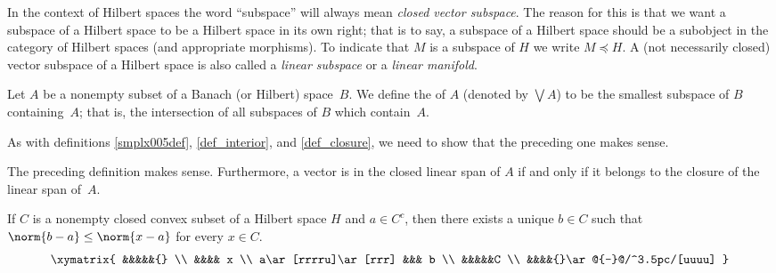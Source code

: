 \begin{conv}  In the context of Hilbert spaces the word ``subspace'' will always mean
\emph{closed vector subspace}.  The reason for this is that we want a subspace of a Hilbert space to be a Hilbert space in its own right; that is to say,
a subspace of a Hilbert space should be a subobject in the category of Hilbert spaces (and appropriate morphisms).  To indicate that $M$ is a subspace of $H$ we write
$M \preccurlyeq H$.  A (not necessarily closed) vector subspace of a Hilbert space is also
called a \emph{linear subspace} or a \emph{linear manifold}.
\end{conv}

\begin{defn} Let $A$ be a nonempty subset of a Banach (or Hilbert) space~$B$.  We define the
 of $A$ (denoted by $\bigvee A$) to be the smallest subspace of $B$ containing~$A$; that is, the
intersection of all subspaces of $B$ which contain~$A$.
\end{defn}

As with definitions \ref{smplx005def}, \ref{def_interior}, and \ref{def_closure}, we need to show that the preceding one makes sense.

\begin{prop} The preceding definition makes sense.  Furthermore, a vector is in the closed linear span of $A$ if and only if it belongs
to the closure of the linear span of~$A$.
\end{prop}

\begin{thm} If $C$ is a nonempty closed convex subset of a
Hilbert space $H$ and $a \in C^c$, then there exists a unique $b \in C$ such that
$\norm{b - a} \le \norm{x - a}$ for every $x \in C$.
 \[\xymatrix{
     &&&&&{}  \\
     &&&& x   \\
     a\ar[rrrru]\ar[rrr] &&& b  \\
     &&&&&C   \\
     &&&&{}\ar@{-}@/^3.5pc/[uuuu]       }\]
\end{thm}

